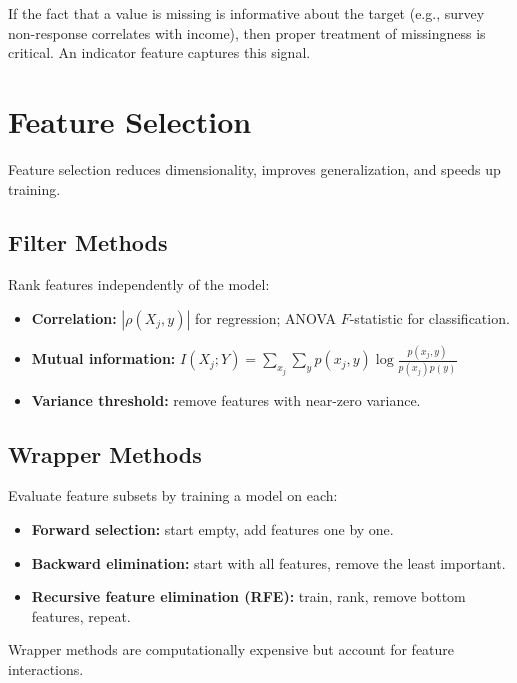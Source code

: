 \begin{principle}
	If the fact that a value is missing is informative about the target (e.g., survey non-response correlates with income), then proper treatment of missingness is critical. An indicator feature captures this signal.
\end{principle}

\section{Feature Selection}

Feature selection reduces dimensionality, improves generalization, and speeds up training.

\subsection{Filter Methods}

Rank features independently of the model:

\begin{itemize}
	\item \textbf{Correlation:} $|\rho(X_j, y)|$ for regression; ANOVA $F$-statistic for classification.
	\item \textbf{Mutual information:} $I(X_j; Y) = \sum_{x_j} \sum_y p(x_j, y) \log \frac{p(x_j, y)}{p(x_j) p(y)}$
	\item \textbf{Variance threshold:} remove features with near-zero variance.
\end{itemize}

\subsection{Wrapper Methods}

Evaluate feature subsets by training a model on each:

\begin{itemize}
	\item \textbf{Forward selection:} start empty, add features one by one.
	\item \textbf{Backward elimination:} start with all features, remove the least important.
	\item \textbf{Recursive feature elimination (RFE):} train, rank, remove bottom features, repeat.
\end{itemize}

Wrapper methods are computationally expensive but account for feature interactions.

